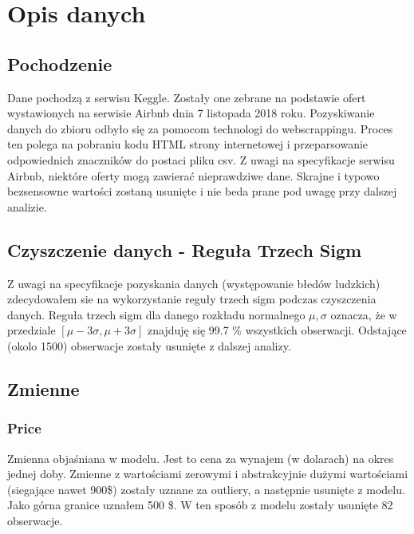 \section{Opis danych}\label{sec:opis-danych}

\subsection{Pochodzenie}\label{subsec:pochodzenie}
Dane pochodzą z serwisu Keggle\cite{berlin-airbnb-data}.
Zostały one zebrane na podstawie ofert wystawionych na serwisie Airbnb dnia 7 listopada 2018 roku.
Pozyskiwanie danych do zbioru odbyło się za pomocom technologi do webscrappingu.
Proces ten polega na pobraniu kodu HTML strony internetowej i przeparsowanie odpowiednich znaczników do postaci pliku csv.
Z uwagi na specyfikacje serwisu Airbnb, niektóre oferty mogą zawierać nieprawdziwe dane.
Skrajne i typowo bezsensowne wartości zostaną usunięte i nie beda prane pod uwagę przy dalszej analizie.

\subsection{Czyszczenie danych - Reguła Trzech Sigm}\label{subsec:czyszczenie-danych-reguła-trzech-sigm}

Z uwagi na specyfikacje pozyskania danych (występowanie błedów ludzkich) zdecydowałem sie na wykorzystanie reguły trzech sigm podczas czyszczenia danych.
Reguła trzech sigm dla danego rozkładu normalnego \(\mu , \sigma\) oznacza, że w przedziale \([\mu - 3\sigma ,\mu + 3\sigma ] \) znajduję się 99.7 \% wszystkich obserwacji.
Odstające (okolo 1500) obserwacje zostały usunięte z dalszej analizy.

\subsection{Zmienne}\label{subsec:zmienne}


\subsubsection{Price}\label{subsubsec:price}
Zmienna objaśniana w modelu.
Jest to cena za wynajem (w dolarach) na okres jednej doby.
Zmienne z wartościami zerowymi i abstrakcyjnie dużymi wartościami (siegające nawet 900\$) zostały uznane za outliery, a następnie usunięte z modelu.
Jako górna granice uznałem 500 \$.
W ten sposób z modelu zostały usunięte 82 obserwacje.


